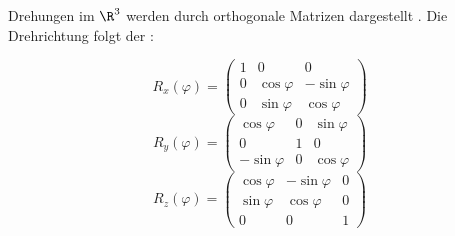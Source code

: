 
\begin{runintext}
Drehungen im $\R^3$ werden durch orthogonale Matrizen dargestellt . Die Drehrichtung folgt der :
\end{runintext}

\begin{formulabox}
  \[
  R_x(\varphi) = \begin{pmatrix}
    1 & 0 & 0 \\
    0 & \cos\varphi & -\sin\varphi \\
    0 & \sin\varphi & \cos\varphi
  \end{pmatrix}
  \]
  \[
  R_y(\varphi) = \begin{pmatrix}
    \cos\varphi & 0 & \sin\varphi \\
    0 & 1 & 0 \\
    -\sin\varphi & 0 & \cos\varphi
  \end{pmatrix}
  \]
  \[
  R_z(\varphi) = \begin{pmatrix}
    \cos\varphi & -\sin\varphi & 0 \\
    \sin\varphi & \cos\varphi & 0 \\
    0 & 0 & 1
  \end{pmatrix}
  \]
\end{formulabox}
